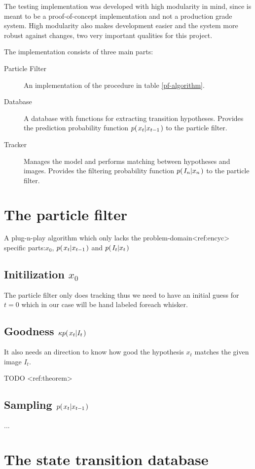 The testing implementation was developed with high modularity in mind, since is meant to be a proof-of-concept implementation and not a production grade system. High modularity also makes development easier and the system more robust against changes, two very important qualities for this project.


The implementation consists of three main parts:
\begin{description}
  \item[Particle Filter] An implementation of the procedure in table \ref{pf-algorithm}.
  \item[Database] A database with functions for extracting transition hypotheses. Provides the prediction probability function $p{(\left. x_t \middle\vert x_{t-1} \right.)}$ to the particle filter.
  \item[Tracker] Manages the model and performs matching between hypotheses and images. Provides the filtering probability function $p{(\left. I_n \middle\vert x_n \right.)}$ to the particle filter.
\end{description}




\section{The particle filter}
    A plug-n-play algorithm which only lacks the problem-domain<ref:encyc> specific parts:$x_0$, $p{(\left. x_t \middle\vert x_{t-1} \right.)}$ and $p{(\left. I_t \middle\vert x_t \right.)}$
    \subsection{Initilization $x_0$}
        The particle filter only does tracking thus we need to have an initial guess for $t=0$ which in our case will be hand labeled foreach whisker.
    \subsection{Goodness $\kappa p{(\left. x_t \middle\vert I_t \right.)}$}
        It also needs an direction to know how good the hypothesis $x_t$ matches the given image $I_t$.

        TODO <ref:theorem>
    \subsection{Sampling $p{(\left. x_t \middle\vert x_{t-1} \right.)}$}

        ...

\section{The state transition database}

